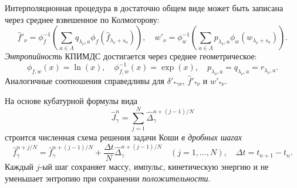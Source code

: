 Интерполяционная процедура в достаточно общем виде может быть записана через среднее взвешенное по Колмогорову:
\begin{equation*}
    \hat{f}'_{\nu} = \phi^{-1}_f\left(\sum_{a\in\Lambda} q_{\lambda_\nu,a}
        \phi_f\left(\hat{f}_{\lambda_\nu+s_a}\right)\right), \quad
    w'_{\nu} = \phi^{-1}_w\left(\sum_{a\in\Lambda} p_{\lambda_\nu,a}
        \phi_w\left(w_{\lambda_\nu+s_a}\right)\right).
\end{equation*}
\emph{Энтропийность} КПИМДС достигается через среднее геометрическое:
\begin{equation*}
   \phi_{f,w}(x) = \ln(x), \quad \phi_{f,w}^{-1}(x) = \exp(x), \quad p_{\lambda_\nu,a} = q_{\lambda_\nu,a} = r_{\lambda_\nu,a}.
\end{equation*}
Аналогичные соотношения справедливы для \(\delta'_{*\gamma\nu}\), \(\hat{f}'_{*\nu}\) и \(w'_{*\nu}\).

На основе кубатурной формулы вида
\begin{equation*}
    \hat{J}_\gamma^n = \sum_{j=1}^N \hat{\Delta}_{\gamma}^{n+(j-1)/N}
\end{equation*}
строится численная схема решения задачи Коши \emph{в дробных шагах}
\begin{equation*}
    \hat{f}_\gamma^{n+j/N} = \hat{f}_\gamma^{n+(j-1)/N} + \frac{\Delta{t}}{N}\hat{\Delta}_{\gamma}^{n+(j-1)/N}
    \quad (j = 1,\dotsc,N), \quad \Delta{t} = t_{n+1}-t_n.
\end{equation*}
Каждый \(j\)-ый шаг сохраняет массу, импульс, кинетическую энергию и не уменьшает энтропию
при сохранении \emph{положительности}.

